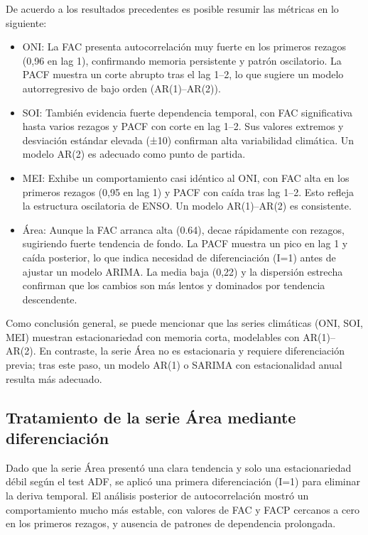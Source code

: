 De acuerdo a los resultados precedentes es posible resumir las métricas en lo siguiente:
\begin{itemize}
    \item ONI: La FAC presenta autocorrelación muy fuerte en los primeros rezagos 
    (0,96 en lag 1), confirmando memoria persistente y patrón oscilatorio. La PACF muestra 
    un corte abrupto tras el lag 1–2, lo que sugiere un modelo autorregresivo de bajo orden 
    (AR(1)–AR(2)).
    
    \item SOI: También evidencia fuerte dependencia temporal, con FAC significativa 
    hasta varios rezagos y PACF con corte en lag 1–2. Sus valores extremos y desviación 
    estándar elevada (±10) confirman alta variabilidad climática. Un modelo AR(2) es adecuado 
    como punto de partida.
    
    \item MEI: Exhibe un comportamiento casi idéntico al ONI, con FAC alta en los 
    primeros rezagos (0,95 en lag 1) y PACF con caída tras lag 1–2. Esto refleja la estructura 
    oscilatoria de ENSO. Un modelo AR(1)–AR(2) es consistente.
    
    \item Área: Aunque la FAC arranca alta (0.64), decae rápidamente con rezagos, 
    sugiriendo fuerte tendencia de fondo. La PACF muestra un pico en lag 1 y caída posterior, 
    lo que indica necesidad de diferenciación (I=1) antes de ajustar un modelo ARIMA. La media 
    baja (0,22) y la dispersión estrecha confirman que los cambios son más lentos y dominados 
    por tendencia descendente.
\end{itemize}




Como conclusión general, se puede mencionar que las series climáticas (ONI, SOI, MEI) muestran 
estacionariedad con memoria corta, modelables con AR(1)–AR(2). En contraste, la serie 
Área no es estacionaria y requiere diferenciación previa; tras este paso, un modelo AR(1) 
o SARIMA con estacionalidad anual resulta más adecuado.

\subsection{Tratamiento de la serie Área mediante diferenciación}

Dado que la serie Área presentó una clara tendencia y solo una estacionariedad débil según 
el test ADF, se aplicó una primera diferenciación (I=1) para eliminar la deriva temporal. 
El análisis posterior de autocorrelación mostró un comportamiento mucho más estable, con 
valores de FAC y FACP cercanos a cero en los primeros rezagos, y ausencia de patrones de 
dependencia prolongada.



